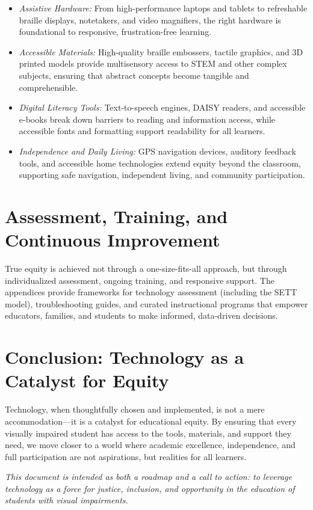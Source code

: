 \begin{itemize}
    \item \emph{Assistive Hardware:} From high-performance laptops and tablets to refreshable braille displays, notetakers, and video magnifiers, the right hardware is foundational to responsive, frustration-free learning.
    \item \emph{Accessible Materials:} High-quality braille embossers, tactile graphics, and 3D printed models provide multisensory access to STEM and other complex subjects, ensuring that abstract concepts become tangible and comprehensible.
    \item \emph{Digital Literacy Tools:} Text-to-speech engines, DAISY readers, and accessible e-books break down barriers to reading and information access, while accessible fonts and formatting support readability for all learners.
    \item \emph{Independence and Daily Living:} GPS navigation devices, auditory feedback tools, and accessible home technologies extend equity beyond the classroom, supporting safe navigation, independent living, and community participation.
\end{itemize}

\section{Assessment, Training, and Continuous Improvement}
\label{sec:intro-assessment-training}

True equity is achieved not through a one-size-fits-all approach, but through individualized assessment, ongoing training, and responsive support. The appendices provide frameworks for technology assessment (including the SETT model), troubleshooting guides, and curated instructional programs that empower educators, families, and students to make informed, data-driven decisions.

\section{Conclusion: Technology as a Catalyst for Equity}
\label{sec:intro-conclusion}

Technology, when thoughtfully chosen and implemented, is not a mere accommodation—it is a catalyst for educational equity. By ensuring that every visually impaired student has access to the tools, materials, and support they need, we move closer to a world where academic excellence, independence, and full participation are not aspirations, but realities for all learners.

\bigskip

\noindent\textit{This document is intended as both a roadmap and a call to action: to leverage technology as a force for justice, inclusion, and opportunity in the education of students with visual impairments.}
